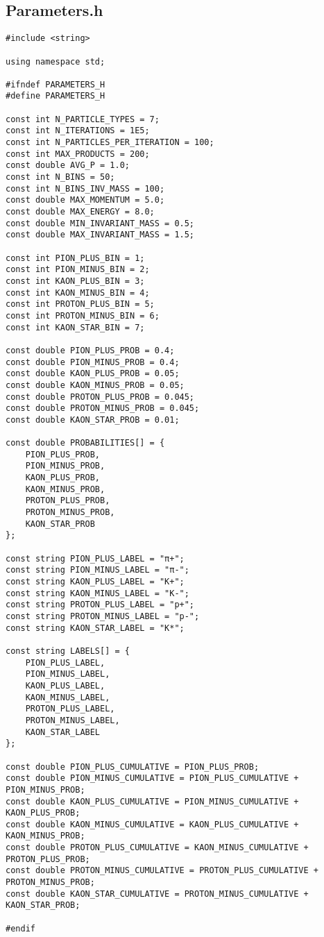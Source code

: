 \documentclass{article}
\begin{document}
\subsection*{Parameters.h}
\begin{verbatim}
#include <string>

using namespace std;

#ifndef PARAMETERS_H
#define PARAMETERS_H

const int N_PARTICLE_TYPES = 7;
const int N_ITERATIONS = 1E5;
const int N_PARTICLES_PER_ITERATION = 100;
const int MAX_PRODUCTS = 200;
const double AVG_P = 1.0;
const int N_BINS = 50;
const int N_BINS_INV_MASS = 100;
const double MAX_MOMENTUM = 5.0;
const double MAX_ENERGY = 8.0;
const double MIN_INVARIANT_MASS = 0.5;
const double MAX_INVARIANT_MASS = 1.5;

const int PION_PLUS_BIN = 1;
const int PION_MINUS_BIN = 2;
const int KAON_PLUS_BIN = 3;
const int KAON_MINUS_BIN = 4;
const int PROTON_PLUS_BIN = 5;
const int PROTON_MINUS_BIN = 6;
const int KAON_STAR_BIN = 7;

const double PION_PLUS_PROB = 0.4;
const double PION_MINUS_PROB = 0.4;
const double KAON_PLUS_PROB = 0.05;
const double KAON_MINUS_PROB = 0.05;
const double PROTON_PLUS_PROB = 0.045;
const double PROTON_MINUS_PROB = 0.045;
const double KAON_STAR_PROB = 0.01;

const double PROBABILITIES[] = {
    PION_PLUS_PROB,
    PION_MINUS_PROB,
    KAON_PLUS_PROB,
    KAON_MINUS_PROB,
    PROTON_PLUS_PROB,
    PROTON_MINUS_PROB,
    KAON_STAR_PROB
};

const string PION_PLUS_LABEL = "π+";
const string PION_MINUS_LABEL = "π-";
const string KAON_PLUS_LABEL = "K+";
const string KAON_MINUS_LABEL = "K-";
const string PROTON_PLUS_LABEL = "p+";
const string PROTON_MINUS_LABEL = "p-";
const string KAON_STAR_LABEL = "K*";

const string LABELS[] = {
    PION_PLUS_LABEL,
    PION_MINUS_LABEL,
    KAON_PLUS_LABEL,
    KAON_MINUS_LABEL,
    PROTON_PLUS_LABEL,
    PROTON_MINUS_LABEL,
    KAON_STAR_LABEL
};

const double PION_PLUS_CUMULATIVE = PION_PLUS_PROB;
const double PION_MINUS_CUMULATIVE = PION_PLUS_CUMULATIVE + PION_MINUS_PROB;
const double KAON_PLUS_CUMULATIVE = PION_MINUS_CUMULATIVE + KAON_PLUS_PROB;
const double KAON_MINUS_CUMULATIVE = KAON_PLUS_CUMULATIVE + KAON_MINUS_PROB;
const double PROTON_PLUS_CUMULATIVE = KAON_MINUS_CUMULATIVE + PROTON_PLUS_PROB;
const double PROTON_MINUS_CUMULATIVE = PROTON_PLUS_CUMULATIVE + PROTON_MINUS_PROB;
const double KAON_STAR_CUMULATIVE = PROTON_MINUS_CUMULATIVE + KAON_STAR_PROB;

#endif
\end{verbatim}
\end{document}

